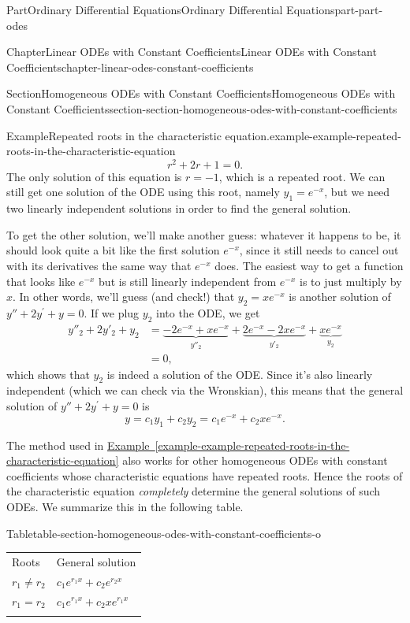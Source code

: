 \documentclass[twoside,10pt,]{book}
\newcommand{\tabularfont}{\relax}
\newcommand{\xreffont}{\relax}
\numberwithin{equation}{part}
\newcommand{\hrulethick} {\noalign{\hrule height 0.11em}}
\begin{document}
\begin{partptx}{Part}{Ordinary Differential Equations}{}{Ordinary Differential Equations}{}{}{part-part-odes}
\begin{chapterptx}{Chapter}{Linear ODEs with Constant Coefficients}{}{Linear ODEs with Constant Coefficients}{}{}{chapter-linear-odes-constant-coefficients}
\begin{sectionptx}{Section}{Homogeneous ODEs with Constant Coefficients}{}{Homogeneous ODEs with Constant Coefficients}{}{}{section-section-homogeneous-odes-with-constant-coefficients}
\begin{example}{Example}{Repeated roots in the characteristic equation.}{example-example-repeated-roots-in-the-characteristic-equation}
\begin{equation*}
r^{2} + 2r + 1 = 0.
\end{equation*}
The only solution of this equation is \(r=-1\), which is a repeated root. We can still get one solution of the ODE using this root, namely \(y_{1} = e^{-x}\), but we need two linearly independent solutions in order to find the general solution.%
\par
To get the other solution, we'll make another guess: whatever it happens to be, it should look quite a bit like the first solution \(e^{-x}\), since it still needs to cancel out with its derivatives the same way that \(e^{-x}\) does. The easiest way to get a function that looks like \(e^{-x}\) but is still linearly independent from \(e^{-x}\) is to just multiply by \(x\). In other words, we'll guess (and check!) that \(y_{2} = xe^{-x}\) is another solution of \(y''+2y^\prime+y = 0\). If we plug \(y_{2}\) into the ODE, we get%
\begin{align*}
y''_{2} + 2y'_{2} + y_{2} & = \underbrace{-2e^{-x} + xe^{-x}}_{y''_{2}} + \underbrace{2e^{-x} - 2xe^{-x}}_{y'_{2}} + \underbrace{xe^{-x}}_{y_{2}} \\
& = 0, 
\end{align*}
which shows that \(y_{2}\) is indeed a solution of the ODE. Since it's also linearly independent (which we can check via the Wronskian), this means that the general solution of \(y''+2y^\prime+y=0\) is%
\begin{equation*}
y = c_{1}y_{1} + c_{2}y_{2} = c_{1}e^{-x} + c_{2}xe^{-x}. 
\end{equation*}
%
\end{example}
The method used in \hyperref[example-example-repeated-roots-in-the-characteristic-equation]{Example~{\xreffont\ref{example-example-repeated-roots-in-the-characteristic-equation}}} also works for other homogeneous ODEs with constant coefficients whose characteristic equations have repeated roots. Hence the roots of the characteristic equation \emph{completely} determine the general solutions of such ODEs. We summarize this in the following table.%
\begin{tableptx}{Table}{\textbf{}}{table-section-homogeneous-odes-with-constant-coefficients-o}{}%
\centering%
{\tabularfont%
\begin{tabular}{ll}\hrulethick
Roots&General solution\tabularnewline\hrulethick
\(r_{1}\neq r_{2}\)&\(c_{1}e^{r_{1}x} + c_{2}e^{r_{2}x}\)\tabularnewline\hrulethick
\(r_{1} = r_{2}\)&\(c_{1}e^{r_{1}x} + c_{2}xe^{r_{1}x}\)\tabularnewline\hrulethick
\end{tabular}
}%
\end{tableptx}%

\end{sectionptx}
\end{chapterptx}
\end{partptx}
\end{document}
